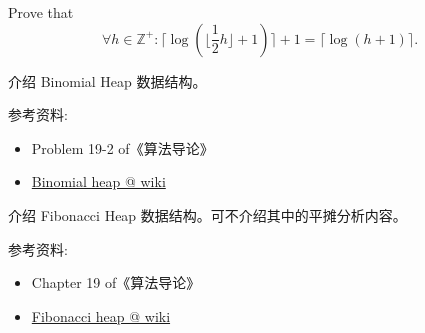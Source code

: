 \documentclass[a4paper, justified]{tufte-handout}
\begin{document}
\begin{solution}
\end{solution}

\begin{problem}[TC 6.4-4]
\end{problem}

\begin{solution}
\end{solution}

\begin{problem}[TC 6.5-5]
\end{problem}

\begin{solution}
\end{solution}

\begin{problem}[TC 6.5-9]
\end{problem}

\begin{solution}
\end{solution}

\beginoptional

\begin{problem}
  Prove that
  \[
    \forall h \in \mathbb{Z}^{+}: \lceil \log(\lfloor \frac{1}{2}h \rfloor + 1) \rceil + 1 = \lceil \log (h + 1) \rceil.
  \]
\end{problem}

\begin{solution}
\end{solution}

\beginot

\begin{ot}
  介绍 Binomial Heap 数据结构。

  \noindent 参考资料:
  \begin{itemize}
    \item Problem 19-2 of《算法导论》
    \item \href{https://en.wikipedia.org/wiki/Binomial\_heap}{Binomial heap @ wiki}
  \end{itemize}
\end{ot}

\begin{ot}
  介绍 Fibonacci Heap 数据结构。可不介绍其中的平摊分析内容。

  \noindent 参考资料:
  \begin{itemize}
    \item Chapter 19 of《算法导论》
    \item \href{https://en.wikipedia.org/wiki/Fibonacci\_heap}{Fibonacci heap @ wiki}
  \end{itemize}
\end{ot}
\end{document}
